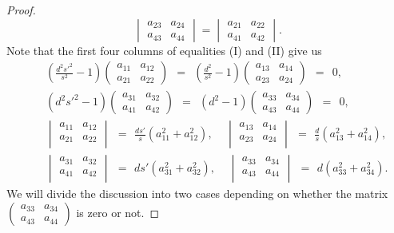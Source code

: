 \documentclass[10pt,a4paper]{amsart}
\begin{document}
\begin{proof}
\begin{equation}
\begin{vmatrix}a_{23} & a_{24} \\ a_{43} & a_{44} \end{vmatrix}=\begin{vmatrix}a_{21} & a_{22} \\ a_{41} & a_{42} \end{vmatrix}.
\end{equation}
Note that the first four columns of equalities (I) and (II) give us
\begin{eqnarray}
&& ( \frac{d^2s'^2}{s^2} -1)  \begin{pmatrix}a_{11} & a_{12} \\ a_{21} & a_{22} \end{pmatrix} \ \ =  \ \   (\frac{d^2}{s^2} -1 )  \begin{pmatrix}a_{13} & a_{14} \\ a_{23} & a_{24} \end{pmatrix} \ \ =  \ \  0,   \label{eq:5.19}\\
&& (d^2s'^2 -1)  \begin{pmatrix}a_{31} & a_{32} \\ a_{41} & a_{42} \end{pmatrix} \ \ =  \ \ ( d^2 -1)  \begin{pmatrix}a_{33} & a_{34} \\ a_{43} & a_{44} \end{pmatrix} \ \ =  \ \ 0 ,  \label{eq:5.20} \\
&& \begin{vmatrix} a_{11} & a_{12} \\ a_{21} & a_{22} \\ \end{vmatrix} \ \, = \ \, \frac{ds'}{s}(a_{11}^2 + a_{12}^2), \ \ \ \ \ \begin{vmatrix} a_{13} & a_{14} \\ a_{23} & a_{24} \\ \end{vmatrix} \ \, = \ \, \frac{d}{s}(a_{13}^2 + a_{14}^2), \label{eq:5.21} \\
&& \begin{vmatrix} a_{31} & a_{32} \\ a_{41} & a_{42} \\ \end{vmatrix} \ \, = \ \, ds' (a_{31}^2 + a_{32}^2), \ \ \ \ \ \begin{vmatrix} a_{33} & a_{34} \\ a_{43} & a_{44} \\ \end{vmatrix} \ \, = \ \, d(a_{33}^2 + a_{34}^2).  \label{eq:5.22}
\end{eqnarray}
We will divide the discussion into two cases depending on whether
the matrix $\begin{pmatrix}a_{33} & a_{34} \\ a_{43} & a_{44} \end{pmatrix} $ is zero or not.


\end{proof}
\end{document}
